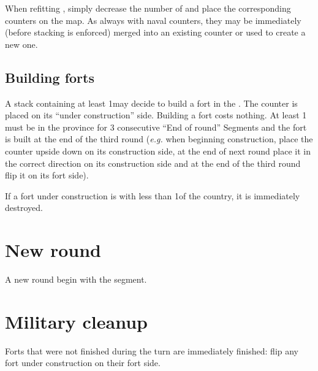 When refitting \ND, simply decrease the number of  \ND and
place the corresponding counters on the map. As always with naval counters,
they may be immediately (before stacking is enforced) merged into an existing
\FLEET counter or used to create a new one.

\subsection{Building forts}
A stack containing at least 1\LD may decide to build a fort in the \ROTW. The
counter is placed on its ``under construction'' side. Building a fort costs
nothing. At least 1 \LD must be in the province for 3 consecutive ``End of
round'' Segments and the fort is built at the end of the third round
(\emph{e.g.} when beginning construction, place the counter upside down on its
construction side, at the end of next round place it in the correct direction
on its construction side and at the end of the third round flip it on its fort
side).

If a fort under construction is with less than 1\LD of the country, it is
immediately destroyed.

\section{New round}
A new round begin with the  segment.

\section{Military cleanup}
\label{chMilitary:cleanup}
Forts that were not finished during the turn are immediately finished: flip
any fort under construction on their fort side.

